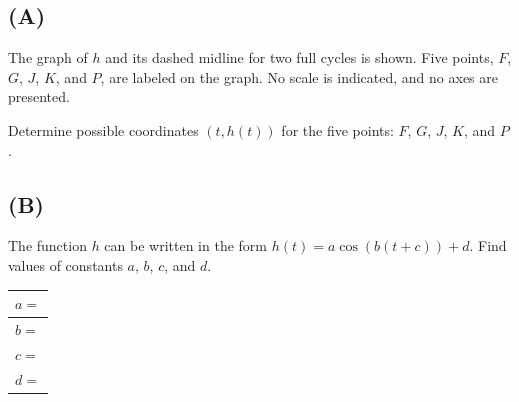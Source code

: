 \documentclass[11pt]{article}
\begin{document}
\subsection*{(A)}
The graph of $h$ and its dashed midline for two full cycles is shown. Five points, $F$, $G$, $J$, $K$, and $P$, are labeled on the graph. No scale is indicated, and no axes are presented.

Determine possible coordinates $(t, h(t))$ for the five points: $F$, $G$, $J$, $K$, and $P$.

\begin{center}
\end{center}

\subsection*{(B)}
The function $h$ can be written in the form $h(t) = a \cos(b(t + c)) + d$. Find values of constants $a$, $b$, $c$, and $d$.

\begin{center}
\begin{tabular}{|l|}
\hline
$a = $ \underline{\hspace{3cm}} \\[10pt]
\hline
$b = $ \underline{\hspace{3cm}} \\[10pt]
\hline
$c = $ \underline{\hspace{3cm}} \\[10pt]
\hline
$d = $ \underline{\hspace{3cm}} \\[10pt]
\hline
\end{tabular}
\end{center}
\end{document}
